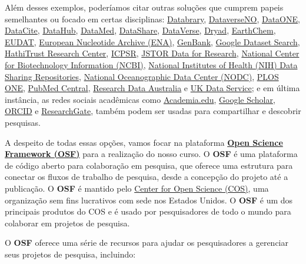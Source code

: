 \documentclass[
  a4paper,
]{article}
\begin{document}
Além desses exemplos, poderíamos citar outras soluções que cumprem
papeis semelhantes ou focado em certas disciplinas:
\href{https://databrary.org}{Databrary},
\href{https://dataverse.no}{DataverseNO},
\href{https://dataone.org}{DataONE},
\href{https://datacite.org}{DataCite},
\href{https://datahub.io}{DataHub}, \href{https://datamed.org}{DataMed},
\href{https://datashare.is.ed.ac.uk}{DataShare},
\href{https://dataverse.org}{DataVerse},
\href{https://datadryad.org}{Dryad},
\href{https://earthchem.org}{EarthChem}, \href{https://eudat.eu}{EUDAT},
\href{https://www.ebi.ac.uk/ena/browser/home}{European Nucleotide
Archive (ENA)}, \href{https://ncbi.nlm.nih.gov/genbank}{GenBank},
\href{https://datasetsearch.research.google.com}{Google Dataset Search},
\href{https://hathitrust.org}{HathiTrust Research Center},
\href{https://icpsr.umich.edu}{ICPSR}, \href{https://jstor.org}{JSTOR
Data for Research}, \href{https://ncbi.nlm.nih.gov}{National Center for
Biotechnology Information (NCBI)}, \href{https://nih.gov}{National
Institutes of Health (NIH) Data Sharing Repositories},
\href{https://data.noaa.gov}{National Oceanographic Data Center (NODC)},
\href{https://plos.org}{PLOS ONE},
\href{https://ncbi.nlm.nih.gov/pmc}{PubMed Central},
\href{http://researchdata.ands.org.au}{Research Data Australia} e
\href{https://ukdataservice.ac.uk}{UK Data Service}; e em última
instância, as redes sociais acadêmicas como
\href{https://academia.edu}{Academia.edu},
\href{https://scholar.google.com}{Google Scholar},
\href{https://orcid.org}{ORCID} e
\href{https://researchgate.net}{ResearchGate}, também podem ser usadas
para compartilhar e descobrir pesquisas.

A despeito de todas essas opções, vamos focar na plataforma
\href{https://osf.io/}{\textbf{Open Science Framework (OSF)}} para a
realização do nosso curso. O \textbf{OSF} é uma plataforma de código
aberto para colaboração em pesquisa, que oferece uma estrutura para
conectar os fluxos de trabalho de pesquisa, desde a concepção do projeto
até a publicação. O \textbf{OSF} é mantido pelo
\href{https://www.cos.io/}{Center for Open Science (COS)}, uma
organização sem fins lucrativos com sede nos Estados Unidos. O
\textbf{OSF} é um dos principais produtos do COS e é usado por
pesquisadores de todo o mundo para colaborar em projetos de pesquisa.

O \textbf{OSF} oferece uma série de recursos para ajudar os
pesquisadores a gerenciar seus projetos de pesquisa, incluindo:
\end{document}

